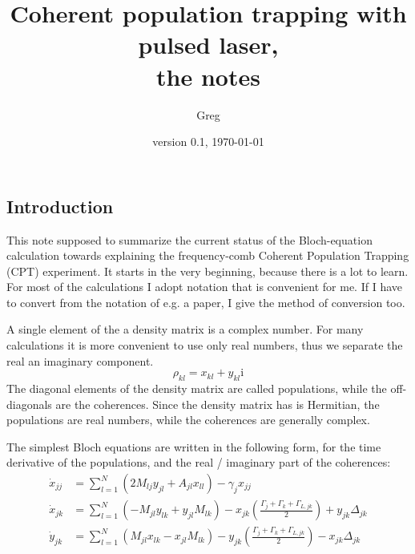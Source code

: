 \documentclass{article}
\title{Coherent population trapping with pulsed laser,\\the notes}
\author{Greg}
\date{version 0.1, \today}
\newcommand{\ComplexUnit}{\ensuremath{\mathrm{i}}}
\begin{document}
\begin{spacing}{1.1}
\maketitle
\tableofcontents
\newpage


\section{Introduction}
This note supposed to summarize the current status of the Bloch-equation calculation towards explaining the frequency-comb Coherent Population Trapping (CPT) experiment. It starts in the very beginning, because there is a lot to learn. For most of the calculations I adopt notation that is convenient for me. If I have to convert from the notation of e.g. a paper, I give the method of conversion too. 

A single element of the a density matrix is a complex number. For many calculations it is more convenient to use only real numbers, thus we separate the real an imaginary component.
\begin{equation}
\rho_{kl} = x_{kl} + y_{kl} \ComplexUnit
\end{equation}
The diagonal elements of the density matrix are called populations, while the off-diagonals are the coherences. Since the density matrix has is Hermitian, the populations are real numbers, while the coherences are generally complex.

The simplest Bloch equations are written in the following form, for the time derivative of the  populations, and the real / imaginary part of the coherences:
\begin{subequations}
\begin{align}
\dot x_{jj} &= \sum_{l=1}^N (2 M_{lj} y_{jl} + A_{jl} x_{ll}) - \gamma_j x_{jj} \\
\dot x_{jk} &= \sum_{l=1}^N (- M_{jl} y_{lk} + y_{jl} M_{lk}) - x_{jk} \left(\frac{\Gamma_j + \Gamma_k + \Gamma_{L,jk}}{2}\right) + y_{jk} \Delta_{jk} \\
\dot y_{jk} &= \sum_{l=1}^N (  M_{jl} x_{lk} - x_{jl} M_{lk}) - y_{jk} \left(\frac{\Gamma_j + \Gamma_k + \Gamma_{L,jk}}{2}\right) - x_{jk} \Delta_{jk}
\end{align}
\end{subequations}


\end{spacing}
\end{document}
